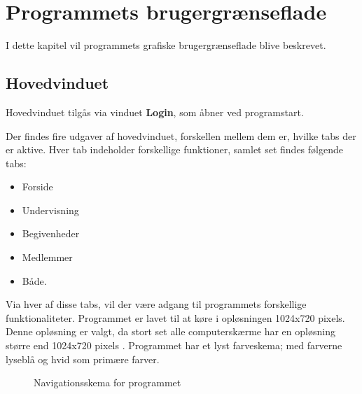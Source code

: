 \chapter{Programmets brugergrænseflade}\label{Programmets_brugergraenseflade}

I dette kapitel vil programmets grafiske brugergrænseflade blive beskrevet.

\section{Hovedvinduet} 
Hovedvinduet tilgås via vinduet \textbf{Login}, som åbner ved programstart. 

Der findes fire udgaver af hovedvinduet, forskellen mellem dem er, hvilke tabs der er aktive.
Hver tab indeholder forskellige funktioner, samlet set findes følgende tabs:
\begin{itemize}%
    \item Forside
    \item Undervisning
    \item Begivenheder
    \item Medlemmer
    \item Både.
\end{itemize}

Via hver af disse tabs, vil der være adgang til programmets forskellige funktionaliteter.
Programmet er lavet til at køre i opløsningen 1024x720 pixels.
Denne opløsning er valgt, da stort set alle computerskærme har en opløsning større end 1024x720 pixels \citep{resolutions}. 
Programmet har et lyst farveskema; med farverne lyseblå og hvid som primære farver.


\begin{center}
    \begin{figure}[H]
        \caption{Navigationsskema for programmet}
        \label{img:programNavigation}
        \vspace{-60pt}
    \end{figure}
\end{center}



